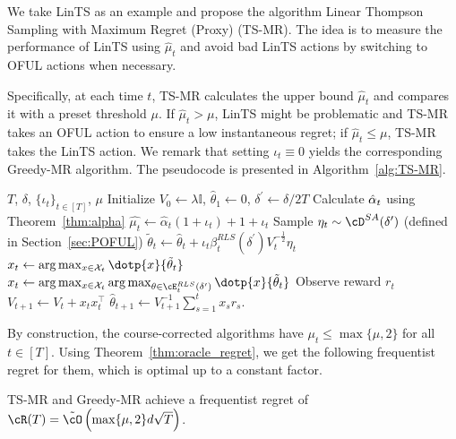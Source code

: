 We take LinTS as an example and propose the algorithm Linear Thompson Sampling with Maximum Regret (Proxy) (TS-MR). The idea is to measure the performance of LinTS using $\hat{\mu}_t$ and avoid bad LinTS actions by switching to OFUL actions when necessary. 





Specifically, at each time $t$, TS-MR calculates the upper bound $\hat{\mu}_t$ and compares it with a preset threshold $\mu$. If  $\hat{\mu}_t > \mu$, LinTS might be problematic and  TS-MR takes an OFUL action to ensure a low instantaneous regret; if $\hat{\mu}_t\leq \mu$, TS-MR  takes the LinTS action. We remark that setting $\iota_t \equiv 0$ yields the corresponding Greedy-MR algorithm. The pseudocode is presented in Algorithm~\ref{alg:TS-MR}.





\begin{algorithm}[!htp]
	\caption{TS-MR (Greedy-MR)}\label{alg:TS-MR}
	\begin{algorithmic}
		\REQUIRE $T$, $\delta$,  $\{\iota_t\}_{t\in [T]}$, $\mu$	
		\STATE Initialize $ V_{0} \leftarrow \lambda \mathbb{I}$,  $\hat{\theta}_{1} \leftarrow 0$, $\delta^\prime \leftarrow \delta/2T$
		\STATE Calculate $\hat{\alpha}_t$ using Theorem~\ref{thm:alpha}
		\STATE $\hat{\mu_t} \leftarrow  \hat{\alpha}_t(1+\iota_t )+1+\iota_t$ 
		\STATE Sample $\eta_t\sim \cD^{SA}(\delta^\prime)$ (defined in Section~\ref{sec:POFUL})
		\STATE $\tilde{\theta}_{t}  \leftarrow \hat{\theta}_t +\iota_t \beta_t^{RLS} (\delta^\prime) V_t^{-\frac{1}{2}} \eta_t$
		\STATE ${x}_{t} \leftarrow \arg \max _{x \in \mathcal{X}_t}\dotp{ x}{ \tilde{\theta}_{t}}$
		\ELSE
		\STATE   ${x}_{t} \leftarrow \arg \max _{x \in \mathcal{X}_t} \arg \max _{\theta \in \cE_t^{RLS}(\delta^\prime) }\dotp{ x}{ \tilde{\theta}_{t}}$
		\ENDIF
		\STATE Observe reward $r_{t}$
		\STATE $V_{t+1} \leftarrow V_{t}+{x}_{t}  {x}_{t}^{\top}$
		\STATE $\hat{\theta}_{t+1} \leftarrow V_{t+1}^{-1}\sum_{s=1}^{t} x_s r_{s}$.
		\ENDFOR
	\end{algorithmic}
\end{algorithm}






By construction, the course-corrected algorithms have $\mu_t \leq  \max\{\mu,2\}$ for all $t\in[T]$. Using Theorem~\ref{thm:oracle_regret}, we get the following frequentist regret for them, which is optimal up to a constant factor.
\begin{corollary} TS-MR and Greedy-MR achieve a frequentist regret of
$
	\cR(T) = \tilde{\cO}\left( \max\{\mu,2\} d \sqrt{T}\right)
$.
\end{corollary}


